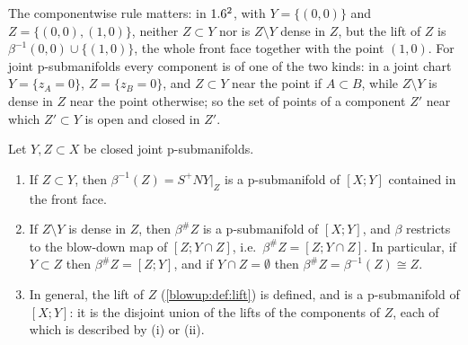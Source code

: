 The componentwise rule matters: in $1.6^2$, with $Y=\{(0,0)\}$ and $Z=\{(0,0),(1,0)\}$,
neither $Z\subset Y$ nor is $Z\setminus Y$ dense in $Z$, but the lift of $Z$ is
$\beta^{-1}(0,0)\cup\{(1,0)\}$, the whole front face together with the point $(1,0)$. For
joint p-submanifolds every component is of one of the two kinds: in a joint chart
$Y=\{z_A=0\}$, $Z=\{z_B=0\}$, and $Z\subset Y$ near the point if $A\subset B$, while
$Z\setminus Y$ is dense in $Z$ near the point otherwise; so the set of points of a component
$Z'$ near which $Z'\subset Y$ is open and closed in $Z'$.

\begin{proposition}\label{blowup:prop:lift}
Let $Y,Z\subset X$ be closed joint p-submanifolds.
\begin{enumerate}[label=\textup{(\roman*)}]
\item If $Z\subset Y$, then $\beta^{-1}(Z)=S^+NY|_Z$ is a p-submanifold of $[X;Y]$
contained in the front face.
\item If $Z\setminus Y$ is dense in $Z$, then $\beta^\#Z$ is a p-submanifold of $[X;Y]$,
and $\beta$ restricts to the blow-down map of $[Z;Y\cap Z]$, i.e.\ $\beta^\#Z=[Z;Y\cap Z]$.
In particular, if $Y\subset Z$ then $\beta^\#Z=[Z;Y]$, and if $Y\cap Z=\emptyset$ then
$\beta^\#Z=\beta^{-1}(Z)\cong Z$.
\item In general, the lift of $Z$ \textup{(}\cref{blowup:def:lift}\textup{)} is defined,
and is a p-submanifold of $[X;Y]$: it is the disjoint union of the lifts of the components
of $Z$, each of which is described by \textup{(i)} or \textup{(ii)}.
\end{enumerate}
\end{proposition}
